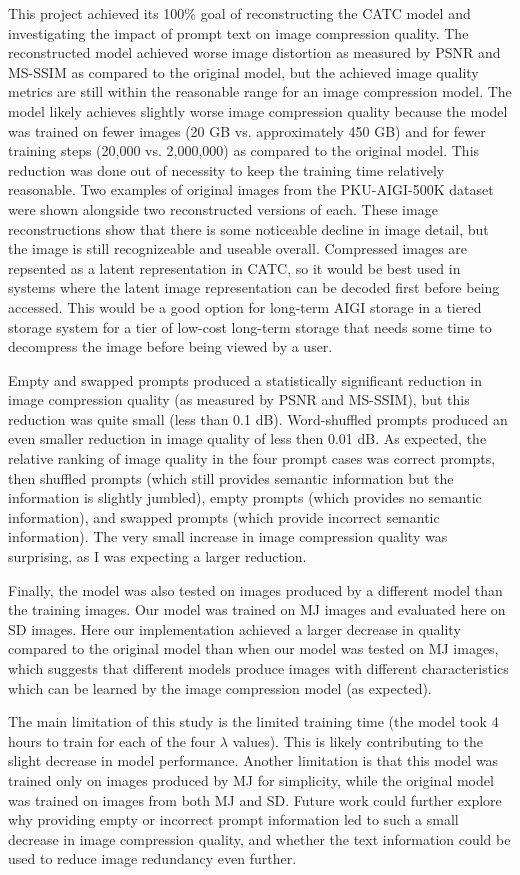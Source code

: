 This project achieved its 100\% goal of reconstructing the CATC model and investigating the impact of prompt text on image compression quality. The reconstructed model achieved worse image distortion as measured by PSNR and MS-SSIM as compared to the original model, but the achieved image quality metrics are still within the reasonable range for an image compression model. The model likely achieves slightly worse image compression quality because the model was trained on fewer images (20 GB vs. approximately 450 GB) and for fewer training steps (20,000 vs. 2,000,000) as compared to the original model. This reduction was done out of necessity to keep the training time relatively reasonable. Two examples of original images from the PKU-AIGI-500K dataset were shown alongside two reconstructed versions of each. These image reconstructions show that there is some noticeable decline in image detail, but the image is still recognizeable and useable overall. Compressed images are repsented as a latent representation in CATC, so it would be best used in systems where the latent image representation can be decoded first before being accessed. This would be a good option for long-term AIGI storage in a tiered storage system for a tier of low-cost long-term storage that needs some time to decompress the image before being viewed by a user. \par
Empty and swapped prompts produced a statistically significant reduction in image compression quality (as measured by PSNR and MS-SSIM), but this reduction was quite small (less than 0.1 dB). Word-shuffled prompts produced an even smaller reduction in image quality of less then 0.01 dB. As expected, the relative ranking of image quality in the four prompt cases was correct prompts, then shuffled prompts (which still provides semantic information but the information is slightly jumbled), empty prompts (which provides no semantic information), and swapped prompts (which provide incorrect semantic information). The very small increase in image compression quality was surprising, as I was expecting a larger reduction. \par
Finally, the model was also tested on images produced by a different model than the training images. Our model was trained on MJ images and evaluated here on SD images. Here our implementation achieved a larger decrease in quality compared to the original model than when our model was tested on MJ images, which suggests that different models produce images with different characteristics which can be learned by the image compression model (as expected). \par
The main limitation of this study is the limited training time (the model took 4 hours to train for each of the four $\lambda$ values). This is likely contributing to the slight decrease in model performance. Another limitation is that this model was trained only on images produced by MJ for simplicity, while the original model was trained on images from both MJ and SD. Future work could further explore why providing empty or incorrect prompt information led to such a small decrease in image compression quality, and whether the text information could be used to reduce image redundancy even further.

